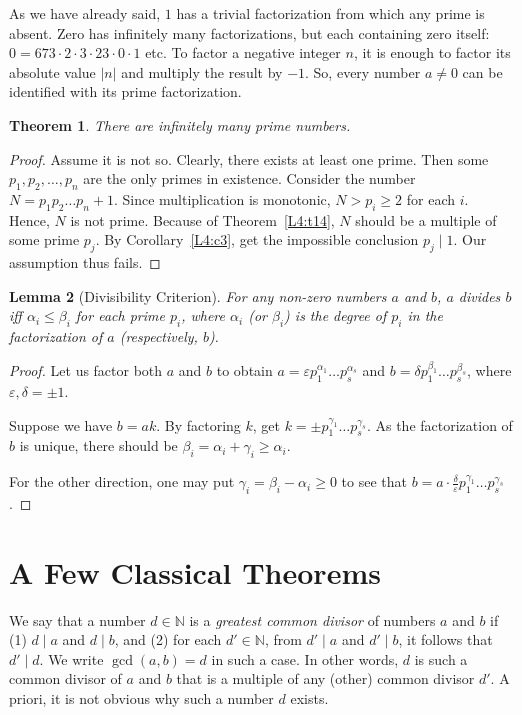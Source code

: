 \documentclass[12pt,notitlepage]{article}
\theoremstyle{plain}
\newtheorem{thm}{Theorem}[section]
\newtheorem{lemma}[thm]{Lemma}
\theoremstyle{definition}
\theoremstyle{plain}
\newcommand{\N}{\mathbb{N}}
\newcommand{\eps}{\varepsilon}
\newcommand{\1}{\mathbf{1}}
\newcommand{\0}{\mathbf{0}}
\newcommand{\dvd}{\mathop{\mid}}
\begin{document}
As we have already said, $1$ has a trivial factorization from which any prime is absent. Zero has infinitely many factorizations, but each containing zero itself: $0 = 673 \cdot 2 \cdot 3 \cdot 23 \cdot 0 \cdot 1$ etc. To factor a negative integer $n$, it is enough to factor its absolute value $|n|$ and multiply the result by $-1$. So, every number $a \neq 0$ can be identified with its prime factorization.

\begin{thm}
There are infinitely many prime numbers.
\end{thm}
\begin{proof}
Assume it is not so. Clearly, there exists at least one prime. Then some $p_1, p_2, \ldots, p_n$ are the only primes in existence. Consider the number $N = p_1 p_2 \ldots p_n + 1$. Since multiplication is monotonic, $N > p_i \geq 2$ for each $i$. Hence, $N$ is not prime. Because of Theorem~\ref{L4:t14}, $N$ should be a multiple of some prime $p_j$. By Corollary~\ref{L4:c3}, get the impossible conclusion $p_j \dvd 1$. Our assumption thus fails.
\end{proof}



\begin{lemma}[Divisibility Criterion]\label{L4:l16}
For any non-zero numbers $a$ and $b$, $a$ divides $b$ iff $\alpha_i \leq \beta_i$ for each prime $p_i$, where $\alpha_i$ (or $\beta_i$) is the degree of $p_i$ in the factorization of $a$ (respectively, $b$).
\end{lemma} 
\begin{proof}
Let us factor both $a$ and $b$ to obtain $a = \eps p^{\alpha_1}_1\ldots p^{\alpha_s}_s$ and $b = \delta p^{\beta_1}_1\ldots p^{\beta_s}_s$, where $\eps, \delta = \pm 1$.

Suppose we have $b = a k$. By factoring $k$, get $k = \pm p^{\gamma_1}_1\ldots p^{\gamma_s}_s$. As the factorization of $b$ is unique, there should be $\beta_i = \alpha_i + \gamma_i \geq \alpha_i$.

For the other direction, one may put $\gamma_i = \beta_i - \alpha_i \geq 0$ to see that $b = a \cdot \frac{\delta}{\eps}  p^{\gamma_1}_1\ldots p^{\gamma_s}_s$.
\end{proof}

\section{A Few Classical Theorems}

We say that a number $d \in \N$ is a \emph{greatest common divisor} of numbers $a$ and $b$ if (1) $d \dvd a$ and $d \dvd b$, and (2) for each $d' \in \N$, from $d' \dvd a$ and $d' \dvd b$, it follows that $d' \dvd d$. We write $\gcd(a, b) = d$ in such a case. In other words, $d$ is such a common divisor of $a$ and $b$ that is a multiple of any (other) common divisor $d'$. A priori, it is not obvious why such a number $d$ exists.
\end{document}
